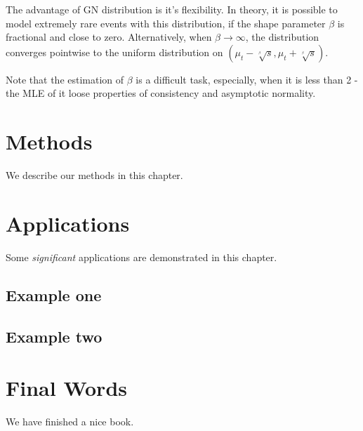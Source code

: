 \documentclass[]{book}
\begin{document}
The advantage of GN distribution is it's flexibility. In theory, it is possible to model extremely rare events with this distribution, if the shape parameter \(\beta\) is fractional and close to zero. Alternatively, when \(\beta \rightarrow \infty\), the distribution converges pointwise to the uniform distribution on \((\mu_t - \sqrt[^\beta]{s}, \mu_t + \sqrt[^\beta]{s})\).

Note that the estimation of \(\beta\) is a difficult task, especially, when it is less than 2 - the MLE of it loose properties of consistency and asymptotic normality.

\hypertarget{methods}{%
\chapter{Methods}\label{methods}}

We describe our methods in this chapter.

\hypertarget{applications}{%
\chapter{Applications}\label{applications}}

Some \emph{significant} applications are demonstrated in this chapter.

\hypertarget{example-one}{%
\section{Example one}\label{example-one}}

\hypertarget{example-two}{%
\section{Example two}\label{example-two}}

\hypertarget{final-words}{%
\chapter{Final Words}\label{final-words}}

We have finished a nice book.


\end{document}
